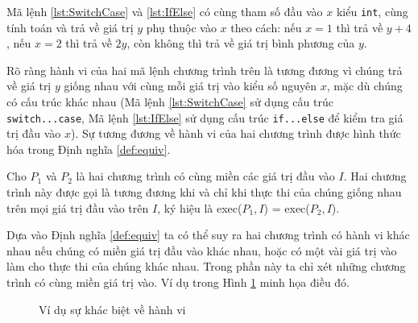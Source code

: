 \begin{minipage}[t]{0.45\linewidth}
  
\end{minipage}%
\hfill\vrule\hfill
\begin{minipage}[t]{0.45\linewidth}
  
\end{minipage}%

Mã lệnh \ref{lst:SwitchCase} và \ref{lst:IfElse} có cùng tham số đầu vào
$ x $ kiểu \texttt{int}, cùng tính toán và trả về giá trị
$ y $ phụ thuộc vào $ x $ theo cách: nếu $ x = 1 $ thì
trả về $ y + 4 $, nếu $ x = 2 $ thì trả về $ 2y $, còn
không thì trả về giá trị bình phương của $ y $.

Rõ ràng hành vi của hai mã lệnh chương trình trên là tương đương vì
chúng trả về giá trị $ y $ giống nhau với cùng mỗi giá trị vào
kiểu số nguyên $ x $, mặc dù chúng có cấu trúc khác nhau (Mã lệnh
\ref{lst:SwitchCase} sử dụng cấu trúc \texttt{switch...case}, Mã lệnh
\ref{lst:IfElse} sử dụng cấu trúc \texttt{if...else} để kiểm tra giá
trị đầu vào $x$). Sự tương đương về hành vi của hai chương trình được
hình thức hóa trong Định nghĩa \ref{def:equiv}.

\begin{definition}
  \label{def:equiv}
  Cho $P_{1}$ và $P_{2}$ là hai chương trình có cùng miền các giá trị
  đầu vào $I$. Hai chương trình này được gọi là tương đương khi và chỉ
  khi thực thi của chúng giống nhau trên mọi giá trị đầu vào trên $I$,
  ký hiệu là exec($P_{1}, I$) = exec($P_{2}, I$).
\end{definition}
	
Dựa vào Định nghĩa \ref{def:equiv} ta có thể suy ra hai chương trình
có hành vi khác nhau nếu chúng có miền giá trị đầu vào khác nhau, hoặc
có một vài giá trị vào làm cho thực thi của chúng khác nhau. Trong
phần này ta chỉ xét những chương trình có cùng miền giá trị vào. 
Ví dụ trong Hình \ref{fig:behavioral-diff} minh họa điều đó.

\begin{figure}[h]
  \centering
  \caption{Ví dụ sự khác biệt về hành vi}
  \label{fig:behavioral-diff}
  \begin{minipage}[t]{0.45\linewidth}
    
  \end{minipage}%
\hfill\vrule\hfill
\begin{minipage}[t]{0.45\linewidth}
  
\end{minipage}%
\end{figure}

